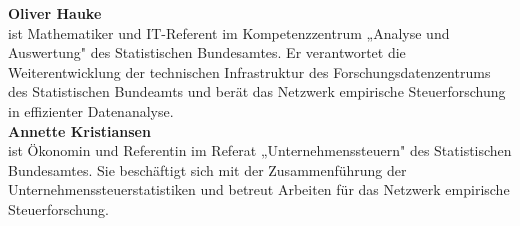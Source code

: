 \begin{titlepage}
\thispagestyle{empty}
\pagestyle{empty}
\onecolumn

\noindent{\color{wistaBlue}\rule{\textwidth}{1pt}}

\vspace{-0.5cm}


\vspace*{0.5cm}

\begin{minipage}[t]{3.9cm}
%
\raggedleft
{}
\fontsize{7}{8.5}\selectfont
\vspace{0pt}%
{\fontsize{8}{9.5}\selectfont\color{wistaBlue}\textbf{Oliver Hauke}}\\[0.15cm]
ist Mathematiker und IT-Referent im Kompetenzzentrum „Analyse und Auswertung" des Statistischen Bundesamtes. Er verantwortet die Weiterentwicklung der technischen Infrastruktur des Forschungsdatenzentrums des Statistischen Bundeamts und berät das Netzwerk empirische Steuerforschung in effizienter Datenanalyse.\\[0.5cm]

{\fontsize{8}{9.5}\selectfont\color{wistaBlue}\textbf{Annette Kristiansen}}\\[0.15cm]
ist Ökonomin und Referentin im Referat „Unternehmenssteuern" des Statistischen Bundesamtes. Sie beschäftigt sich mit der Zusammenführung der Unternehmenssteuerstatistiken und betreut Arbeiten für das Netzwerk empirische Steuerforschung. 

\end{minipage}%
\hspace{0.4cm}%
\hspace{0.4cm}%
\begin{minipage}[t]{11.8cm}
\raggedright
\vspace{1.2cm}%


\end{minipage}
\end{titlepage}
